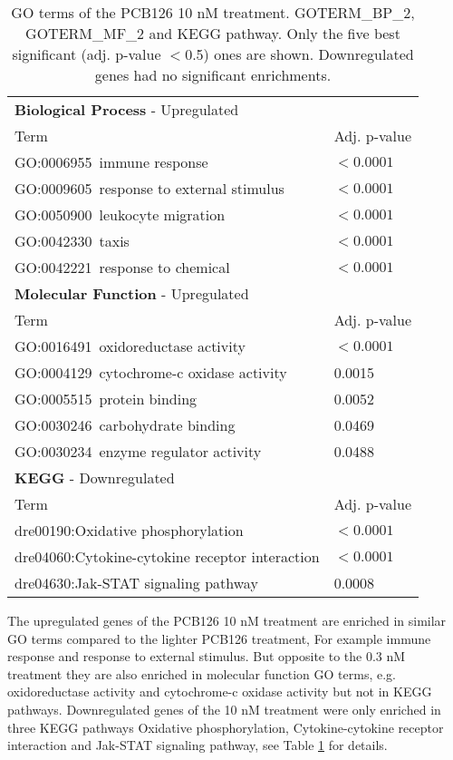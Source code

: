 \documentclass{article}
\begin{document}
\begin{table}
  \begin{tabular}{ll}
    \hline
    {\bf Biological Process} - Upregulated & \\
    Term & Adj. p-value \\
    \hline
    GO:0006955~immune response & $<0.0001$ \\
    GO:0009605~response to external stimulus & $<0.0001$ \\
    GO:0050900~leukocyte migration & $<0.0001$ \\
    GO:0042330~taxis & $<0.0001$ \\
    GO:0042221~response to chemical & $<0.0001$ \\
    \hline
    {\bf Molecular Function} - Upregulated & \\
    Term & Adj. p-value \\
    \hline
    GO:0016491~oxidoreductase activity       &  $<0.0001$ \\
    GO:0004129~cytochrome-c oxidase activity & 0.0015 \\
    GO:0005515~protein binding               & 0.0052 \\
    GO:0030246~carbohydrate binding          & 0.0469 \\
    GO:0030234~enzyme regulator activity     & 0.0488 \\
     \hline
    {\bf KEGG} - Downregulated \\
    Term & Adj. p-value \\
    \hline
    dre00190:Oxidative phosphorylation  & $<0.0001$ \\
    dre04060:Cytokine-cytokine receptor interaction & $<0.0001$ \\
    dre04630:Jak-STAT signaling pathway & 0.0008 \\
  \end{tabular}
  \caption{GO terms of the PCB126 10 nM treatment. GOTERM\_BP\_2,
    GOTERM\_MF\_2 and KEGG pathway. Only the five best significant
    (adj. p-value $<$0.5) ones are shown. Downregulated genes had no
    significant enrichments.}
  \label{tab:go-10}
\end{table}

The upregulated genes of the PCB126 10 nM treatment are enriched in similar GO terms compared to the lighter PCB126 treatment, For example immune response and response to external stimulus. But opposite to the 0.3 nM treatment they are also enriched in molecular function GO terms, e.g. oxidoreductase activity and cytochrome-c oxidase activity but not in KEGG pathways. Downregulated genes of the 10 nM treatment were only enriched in three KEGG pathways Oxidative phosphorylation, Cytokine-cytokine receptor interaction and Jak-STAT signaling pathway, see Table \ref{tab:go-10} for details.
\end{document}

